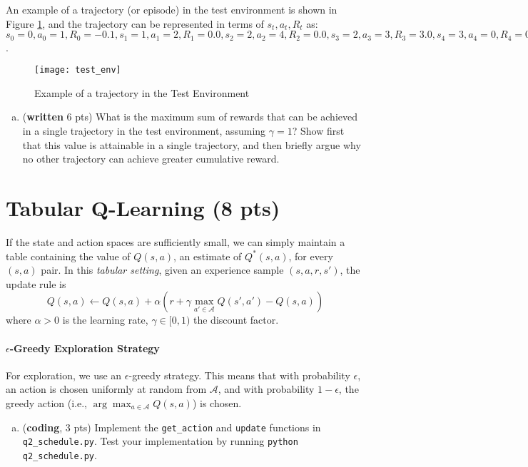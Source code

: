 \documentclass{article}
\newif\ifanswers
\newcommand{\ifans}[1]{\ifanswers \color{red} \textbf{Solution: } #1 \color{black} \else {} \fi}
\begin{document}
An example of a trajectory (or episode) in the test environment is shown in Figure \ref{fig:test_env}, and the trajectory can be represented in terms of $s_t, a_t, R_t$ as: 
$s_0 = 0, a_0=1, R_0 = -0.1, s_1=1, a_1=2, R_1 = 0.0, s_2=2, a_2=4, R_2 = 0.0, s_3=2, a_3=3, R_3  = 3.0, s_4=3, a_4=0, R_4 = 0.2, s_5=0 $.

\begin{figure}[H]
  \centering
  \texttt{[image: test\_env]}
  \caption{Example of a trajectory in the Test Environment}
  \label{fig:test_env}
\end{figure}

\begin{enumerate}[(a)]
\item (\textbf{written} 6 pts) What is the maximum sum of rewards that can be achieved in a single trajectory in the test environment, assuming $\gamma = 1$? Show first that this value is attainable in a single trajectory, and then briefly argue why no other trajectory can achieve greater cumulative reward.
\end{enumerate}

\ifans{
}


\section{Tabular Q-Learning (8 pts)}\label{tabular-q-learn}
If the state and action spaces are sufficiently small, we can simply maintain a table containing the value of $Q(s,a)$, an estimate of $Q^*(s,a)$, for every $(s,a)$ pair.
In this \emph{tabular setting}, given an experience sample $(s, a, r, s')$, the update rule is
\begin{equation}
Q(s,a) \leftarrow Q(s,a) + \alpha\left(r + \gamma \max_{a' \in \mathcal{A}}Q(s',a') - Q(s,a)\right) \label{eqn:tabularq}
\end{equation}
where $\alpha > 0$ is the learning rate, $\gamma \in [0,1)$ the discount factor.

\paragraph{$\epsilon$-Greedy Exploration Strategy}
For exploration, we use an $\epsilon$-greedy strategy.
This means that with probability $\epsilon$, an action is chosen uniformly at random from $\mathcal{A}$, and with probability $1-\epsilon$, the greedy action (i.e., $\arg\max_{a \in \mathcal{A}} Q(s,a)$) is chosen.
\begin{enumerate}[(a)]
\item (\textbf{coding}, 3 pts) Implement the \texttt{get\_action} and \texttt{update} functions in \texttt{q2\_schedule.py}. Test your implementation by running \texttt{python q2\_schedule.py}.	
\end{enumerate}
\end{document}
